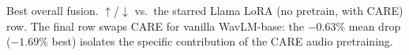 \begin{table}[t]
\vspace{2pt}
\footnotesize
{} Best overall fusion.
$\uparrow$/$\downarrow$ vs.\ the starred Llama LoRA (no pretrain, with CARE) row.
The final row swaps CARE for vanilla WavLM-base: the $-0.63\%$ mean drop
($-1.69\%$ best) isolates the specific contribution of the CARE audio pretraining.
\end{table}
